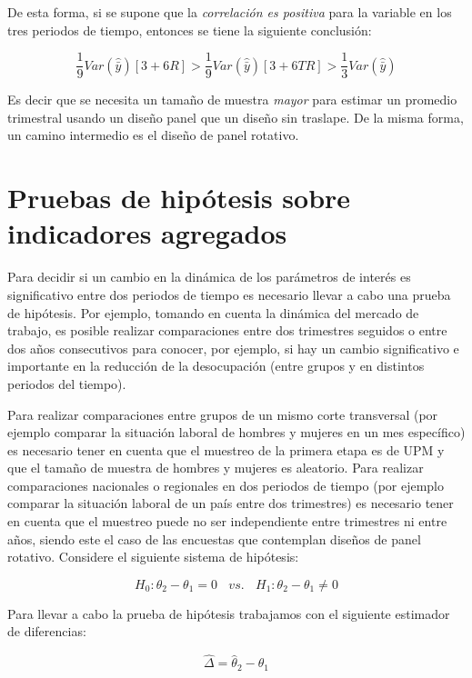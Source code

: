 \documentclass[
  12pt,
]{book}
\begin{document}
De esta forma, si se supone que la \emph{correlación es positiva} para la
variable en los tres periodos de tiempo, entonces se tiene la siguiente
conclusión:

\[
\frac{1}{9} Var(\hat{\bar{y}}) [3+6R] > \frac{1}{9} Var(\hat{\bar{y}}) [3+6TR] > \frac{1}{3} Var(\hat{\bar{y}})
\]

Es decir que se necesita un tamaño de muestra \emph{mayor} para estimar un
promedio trimestral usando un diseño panel que un diseño sin traslape. De la misma forma, un camino intermedio es el diseño de panel rotativo.

\hypertarget{pruebas-de-hipuxf3tesis-sobre-indicadores-agregados}{%
\section{Pruebas de hipótesis sobre indicadores agregados}\label{pruebas-de-hipuxf3tesis-sobre-indicadores-agregados}}

Para decidir si un cambio en la dinámica de los parámetros de interés es
significativo entre dos periodos de tiempo es necesario llevar a cabo
una prueba de hipótesis. Por ejemplo, tomando en cuenta la dinámica del
mercado de trabajo, es posible realizar comparaciones entre dos
trimestres seguidos o entre dos años consecutivos para conocer, por
ejemplo, si hay un cambio significativo e importante en la reducción de
la desocupación (entre grupos y en distintos periodos del tiempo).

Para realizar comparaciones entre grupos de un mismo corte transversal
(por ejemplo comparar la situación laboral de hombres y mujeres en un
mes específico) es necesario tener en cuenta que el muestreo de la
primera etapa es de UPM y que el tamaño de muestra de hombres y mujeres
es aleatorio. Para realizar comparaciones nacionales o regionales en dos
periodos de tiempo (por ejemplo comparar la situación laboral de un país
entre dos trimestres) es necesario tener en cuenta que el muestreo puede
no ser independiente entre trimestres ni entre años, siendo este el caso
de las encuestas que contemplan diseños de panel rotativo. Considere el
siguiente sistema de hipótesis:

\[
H_0: \theta_2 - \theta_1 = 0 \ \ \ \ vs. \ \ \ \ H_1: \theta_2 - \theta_1 \neq 0
\]

Para llevar a cabo la prueba de hipótesis trabajamos con el siguiente
estimador de diferencias:

\[
\hat{\Delta} = \hat{\theta}_2 - \hat{\theta}_1
\]
\end{document}
